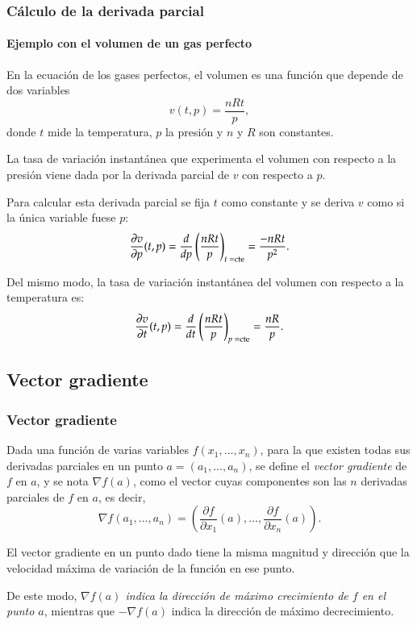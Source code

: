 \begin{frame}
\frametitle{Cálculo de la derivada parcial}
\framesubtitle{Ejemplo con el volumen de un gas perfecto}
En la ecuación de los gases perfectos, el volumen es una función que depende de dos variables  
\[v(t,p)=\frac{nRt}{p},\]
donde $t$ mide la temperatura, $p$ la presión y $n$ y $R$ son constantes.

La tasa de variación instantánea que experimenta el volumen con respecto a la presión viene dada por la derivada parcial de $v$ con respecto a $p$.

Para calcular esta derivada parcial se fija $t$ como constante y se deriva $v$ como si la única variable fuese $p$:
\[
\frac{\partial v}{\partial p}(t,p)=\frac{d}{dp}\left(\frac{nRt}{p}\right)_{\mbox{\scriptsize $t=$cte}}=\frac{-nRt}{p^2}.
\]

Del mismo modo, la tasa de variación instantánea del volumen con respecto a la temperatura es:
\[
\frac{\partial v}{\partial t}(t,p)=\frac{d}{dt}\left(\frac{nRt}{p}\right)_{\mbox{\scriptsize$p=$cte}}=\frac{nR}{p}.
\]
\end{frame}



\subsection{Vector gradiente}
\begin{frame}
\frametitle{Vector gradiente}
\begin{definicion}
Dada una función de varias variables $f(x_1,\ldots,x_n)$, para la que existen todas sus derivadas parciales en un punto $a=(a_1,\ldots,a_n)$, se define el \emph{vector gradiente} de $f$ en $a$, y se nota $\nabla f(a)$, como el vector cuyas componentes son las $n$ derivadas parciales de $f$ en $a$, es decir, 
\[
\nabla f(a_1,\ldots,a_n)=\left(\frac{\partial f}{\partial x_1}(a),\ldots,\frac{\partial f}{\partial x_n}(a)\right).
\]
\end{definicion}

El vector gradiente en un punto dado tiene la misma magnitud y dirección que la velocidad máxima de variación de la
función en ese punto. 

De este modo, \alert{\emph{$\nabla f(a)$ indica la dirección de máximo crecimiento de $f$ en el punto $a$}}, mientras que $- \nabla f(a)$ indica la dirección de máximo decrecimiento.
\end{frame}



